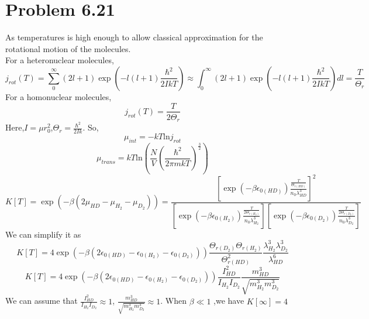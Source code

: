 \documentclass{article}
\begin{document}
\section*{Problem 6.21}
As temperatures is high enough to allow classical approximation for the rotational motion of the molecules.\\
For a heteronuclear molecules,
\begin{equation}
j_{rot}(T)=\sum_0^{\infty} (2l+1) \exp(-l(l+1) \frac{\hbar^2}{2IkT}) \approx \int_0^{\infty} (2l+1) \exp(-l(l+1) \frac{\hbar^2}{2IkT}) dl =\frac{T}{\Theta_r}
\end{equation}
For a homonuclear molecules,
\begin{equation}
j_{rot}(T) = \frac{T}{2\Theta_r}
\end{equation}
Here,$I=\mu r_0^2$,$\Theta_r=\frac{\hbar^2}{2Ik}$.
So,
\begin{equation}
\mu_{int} = -kT \mathrm{ln}j_{rot}
\end{equation}
\begin{equation}
\mu_{trans}= kT \mathrm{ln}(\frac{N}{V} \left(\frac{\hbar^2}{2\pi mkT}\right)^{\frac{3}{2}} )
\end{equation}
\begin{equation}
K[T]=\exp(-\beta(2\mu_{HD}-\mu_{H_2}-\mu_{D_2})) =\frac{\left [\exp(-\beta \epsilon_{0(HD)}) \frac{\frac{T}{\Theta_{r(HD)}}}{n_0 \lambda_{HD}^3} \right]^2} {\left [\exp(-\beta \epsilon_{0(H_2)}) \frac{\frac{T}{2\Theta_{r(H_2)}}}{n_0 \lambda_{H_2}^3} \right] \left [\exp(-\beta \epsilon_{0(D_2)}) \frac{\frac{T}{2\Theta_{r(D_2)}}}{n_0 \lambda_{D_2}^3} \right]}
\end{equation}
We can simplify it as
\begin{equation}
K[T]=4 \exp(-\beta(2\epsilon_{0(HD)}-\epsilon_{0(H_2)}-\epsilon_{0(D_2)})) \frac{\Theta_{r(D_2)}\Theta_{r(H_2)}}{\Theta_{r(HD)}^2} \frac{\lambda_{H_2}^3\lambda_{D_2}^3}{\lambda_{HD}^6}
\end{equation}
\begin{equation}
K[T]=4 \exp(-\beta(2\epsilon_{0(HD)}-\epsilon_{0(H_2)}-\epsilon_{0(D_2)})) \frac{I_{HD}^2}{I_{H_2}I_{D_2}} \frac{m_{HD}^3}{\sqrt{m_{H_2}^3m_{D_2}^3}}
\end{equation}
We can assume that $\frac{I_{HD}^2}{I_{H_2}I_{D_2}} \approx 1$, $\frac{m_{HD}^3}{\sqrt{m_{H_2}^3m_{D_2}^3}} \approx 1$. When $\beta \ll 1$ ,we have $K[\infty] = 4$
\end{document}
